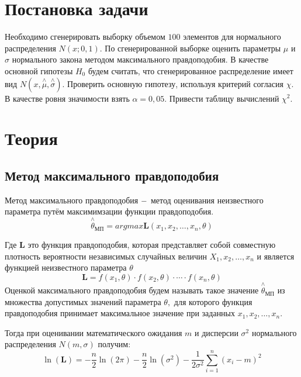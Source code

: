 \documentclass[a4]{article}
\begin{document}
\section{Постановка задачи}

Необходимо сгенерировать выборку объемом $100$ элементов для нормального распределения $N(x;0,1).$ По сгенерированной выборке оценить параметры $\mu$ и $\sigma$ нормального закона методом максимального правдоподобия. В качестве основной гипотезы $H_0$ будем считать, что сгенерированное распределение имеет вид $N(x,\overset{\wedge}{\mu},\overset{\wedge}{\sigma} ).$ Проверить основную гипотезу, используя критерий согласия $\chi$. В качестве ровня значимости взять $\alpha=0,05.$ Привести таблицу вычислений $\chi^2.$

\section{Теория}
\subsection{Метод максимального правдоподобия}
Метод максимального правдоподобия $\--$ метод оценивания неизвестного параметра путём максимимзации функции правдоподобия.
\begin{equation}
    \overset{\wedge}{\theta}_{\text{МП}}=argmax \mathbf{L}(x_1,x_2,\ldots,x_n,\theta)
\end{equation}

Где $\mathbf{L}$ это функция правдоподобия, которая представляет собой совместную плотность вероятности независимых случайных величин $X_1,x_2,\ldots,x_n$ и является функцией неизвестного параметра $\theta$
\begin{equation}
    \mathbf{L} = f(x_1,\theta)\cdot f(x_2,\theta)\cdot\cdots\cdot f(x_n,\theta)
\end{equation}
Оценкой максимального правдоподобия будем называть такое значение $\overset{\wedge}{\theta}_{\text{МП}}$ из множества допустимых значений параметра $\theta,$ для которого функция правдоподобия принимает максимальное значение при заданных $x_1,x_2,\ldots,x_n.$

Тогда при оценивании математического ожидания $m$ и дисперсии $\sigma^2$ нормального распределения $N(m,\sigma)$ получим:
\begin{equation}
    \ln(\mathbf{L})=-\frac{n}{2}\ln(2\pi)-\frac{n}{2}\ln\left(\sigma^2\right)-\frac{1}{2\sigma^2}\sum\limits_{i=1}^n(x_i-m)^2
\end{equation}
\end{document}

